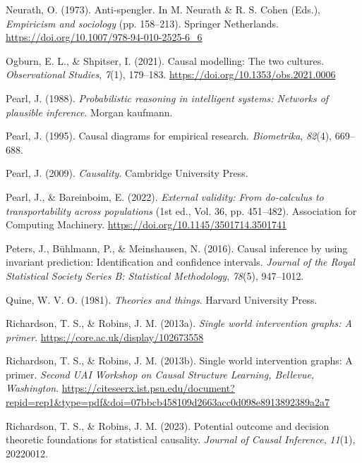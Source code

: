 \documentclass[
  single column]{article}
\newlength{\cslhangindent}
\newenvironment{CSLReferences}[2] %
 {\begin{list}{}{%
  \setlength{\itemindent}{0pt}
  \setlength{\leftmargin}{0pt}
  \setlength{\parsep}{0pt}
  \ifodd #1
   \setlength{\leftmargin}{\cslhangindent}
   \setlength{\itemindent}{-1\cslhangindent}
  \fi
  \setlength{\itemsep}{#2\baselineskip}}}
 {\end{list}}
\begin{document}
\begin{CSLReferences}{1}{0}
Neurath, O. (1973). Anti-spengler. In M. Neurath \& R. S. Cohen (Eds.),
\emph{Empiricism and sociology} (pp. 158--213). Springer Netherlands.
\url{https://doi.org/10.1007/978-94-010-2525-6_6}

Ogburn, E. L., \& Shpitser, I. (2021). Causal modelling: The two
cultures. \emph{Observational Studies}, \emph{7}(1), 179--183.
\url{https://doi.org/10.1353/obs.2021.0006}

Pearl, J. (1988). \emph{Probabilistic reasoning in intelligent systems:
Networks of plausible inference}. Morgan kaufmann.

Pearl, J. (1995). Causal diagrams for empirical research.
\emph{Biometrika}, \emph{82}(4), 669--688.

Pearl, J. (2009). \emph{Causality}. Cambridge University Press.

Pearl, J., \& Bareinboim, E. (2022). \emph{External validity: From
do-calculus to transportability across populations} (1st ed., Vol. 36,
pp. 451--482). Association for Computing Machinery.
\url{https://doi.org/10.1145/3501714.3501741}

Peters, J., Bühlmann, P., \& Meinshausen, N. (2016). Causal inference by
using invariant prediction: Identification and confidence intervals.
\emph{Journal of the Royal Statistical Society Series B: Statistical
Methodology}, \emph{78}(5), 947--1012.

Quine, W. V. O. (1981). \emph{Theories and things}. Harvard University
Press.

Richardson, T. S., \& Robins, J. M. (2013a). \emph{Single world
intervention graphs: A primer}.
\url{https://core.ac.uk/display/102673558}

Richardson, T. S., \& Robins, J. M. (2013b). Single world intervention
graphs: A primer. \emph{Second UAI Workshop on Causal Structure
Learning, {B}ellevue, {W}ashington}.
\url{https://citeseerx.ist.psu.edu/document?repid=rep1&type=pdf&doi=07bbcb458109d2663acc0d098e8913892389a2a7}

Richardson, T. S., \& Robins, J. M. (2023). Potential outcome and
decision theoretic foundations for statistical causality. \emph{Journal
of Causal Inference}, \emph{11}(1), 20220012.


\end{CSLReferences}
\end{document}
